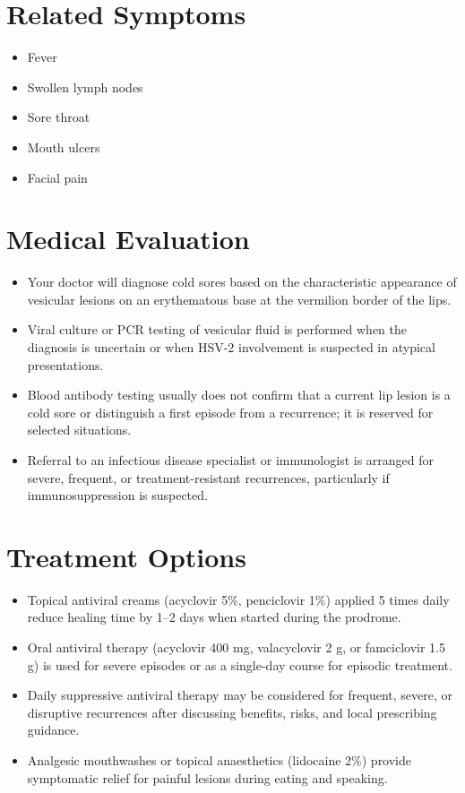 \section*{Related Symptoms}
\begin{itemize}
  \item Fever
  \item Swollen lymph nodes
  \item Sore throat
  \item Mouth ulcers
  \item Facial pain
\end{itemize}

\section*{Medical Evaluation}
\begin{itemize}
  \item Your doctor will diagnose cold sores based on the characteristic appearance of vesicular lesions on an erythematous base at the vermilion border of the lips.
  \item Viral culture or PCR testing of vesicular fluid is performed when the diagnosis is uncertain or when HSV-2 involvement is suspected in atypical presentations.
  \item Blood antibody testing usually does not confirm that a current lip lesion is a cold sore or distinguish a first episode from a recurrence; it is reserved for selected situations.
  \item Referral to an infectious disease specialist or immunologist is arranged for severe, frequent, or treatment-resistant recurrences, particularly if immunosuppression is suspected.
\end{itemize}

\section*{Treatment Options}
\begin{itemize}
  \item Topical antiviral creams (acyclovir 5\%, penciclovir 1\%) applied 5 times daily reduce healing time by 1–2 days when started during the prodrome.
  \item Oral antiviral therapy (acyclovir 400 mg, valacyclovir 2 g, or famciclovir 1.5 g) is used for severe episodes or as a single-day course for episodic treatment.
  \item Daily suppressive antiviral therapy may be considered for frequent, severe, or disruptive recurrences after discussing benefits, risks, and local prescribing guidance.
  \item Analgesic mouthwashes or topical anaesthetics (lidocaine 2\%) provide symptomatic relief for painful lesions during eating and speaking.
\end{itemize}

